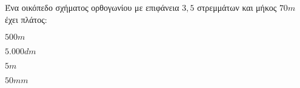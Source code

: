 \documentclass[internet]{diag-xelatex}
\begin{document}
\begin{thema}
\begin{erwthma}
\begin{rlist}
\begin{multicols}{4}
\begin{alist}
\end{alist}
\end{multicols}
\item Ένα οικόπεδο σχήματος ορθογωνίου με επιφάνεια $ 3{,}5 $ στρεμμάτων και μήκος $ 70\si{m} $ έχει πλάτος:
\begin{multicols}{4}
\begin{alist}
\item $ 500\si{m} $
\item $ 5.000\si{dm} $
\item $ 5\si{m} $
\item $ 50m\si{m} $
\end{alist}
\end{multicols}
\end{rlist}
\end{erwthma}
\end{thema}
\askhseis
\end{document}
